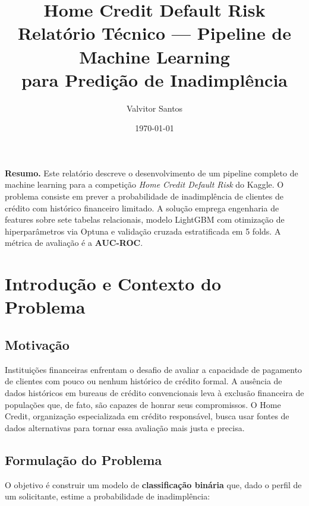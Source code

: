 \documentclass[12pt, a4paper]{article}
\title{
    \vspace{-1cm}
    {\Large \textbf{Home Credit Default Risk}} \\[0.5em]
    {\large Relat\'orio T\'ecnico --- Pipeline de Machine Learning\\
    para Predi\c{c}\~ao de Inadimpl\^encia}
}
\author{Valvitor Santos}
\date{\today}
\begin{document}
\maketitle
\thispagestyle{fancy}

\begin{center}
\begin{minipage}{0.85\textwidth}
\small\textbf{Resumo.}
Este relat\'orio descreve o desenvolvimento de um pipeline completo de machine learning
para a competi\c{c}\~ao \textit{Home Credit Default Risk} do Kaggle. O problema consiste em
prever a probabilidade de inadimpl\^encia de clientes de cr\'edito com hist\'orico
financeiro limitado. A solu\c{c}\~ao emprega engenharia de features sobre sete tabelas
relacionais, modelo LightGBM com otimiza\c{c}\~ao de hiperpar\^ametros via Optuna e
valida\c{c}\~ao cruzada estratificada em 5 folds. A m\'etrica de avalia\c{c}\~ao \'e
a \textbf{AUC-ROC}.
\end{minipage}
\end{center}

\bigskip
\tableofcontents
\newpage

\section{Introdu\c{c}\~ao e Contexto do Problema}

\subsection{Motiva\c{c}\~ao}

Institui\c{c}\~oes financeiras enfrentam o desafio de avaliar a capacidade de pagamento
de clientes com pouco ou nenhum hist\'orico de cr\'edito formal. A aus\^encia de dados
hist\'oricos em bureaus de cr\'edito convencionais leva \`a exclus\~ao financeira de
popula\c{c}\~oes que, de fato, s\~ao capazes de honrar seus compromissos. O Home Credit,
organiza\c{c}\~ao especializada em cr\'edito respons\'avel, busca usar fontes de dados
alternativas para tornar essa avalia\c{c}\~ao mais justa e precisa.

\subsection{Formula\c{c}\~ao do Problema}

O objetivo \'e construir um modelo de \textbf{classifica\c{c}\~ao bin\'aria} que, dado
o perfil de um solicitante, estime a probabilidade de inadimpl\^encia:
\end{document}

